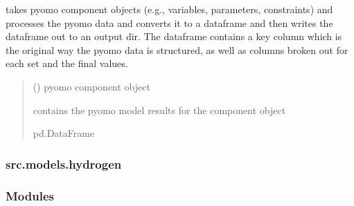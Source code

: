 \documentclass[letterpaper,10pt,english]{sphinxmanual}
\begin{document}
\begin{fulllineitems}
\label{\detokenize{src.models.electricity.scripts.utilities:src.models.electricity.scripts.utilities.create_obj_df}}
\pysigstartsignatures
\pysiglinewithargsret
{}
{}
{}
\pysigstopsignatures
\sphinxAtStartPar
takes pyomo component objects (e.g., variables, parameters, constraints) and processes the
pyomo data and converts it to a dataframe and then writes the dataframe out to an output dir.
The dataframe contains a key column which is the original way the pyomo data is structured,
as well as columns broken out for each set and the final values.
\begin{quote}\begin{description}
\sphinxAtStartPar
{} () \textendash{} pyomo component object

\sphinxAtStartPar
contains the pyomo model results for the component object

\sphinxAtStartPar
pd.DataFrame

\end{description}\end{quote}

\end{fulllineitems}


\sphinxstepscope


\subsubsection{src.models.hydrogen}
\label{\detokenize{src.models.hydrogen:module-src.models.hydrogen}}\label{\detokenize{src.models.hydrogen:src-models-hydrogen}}\label{\detokenize{src.models.hydrogen::doc}}\subsubsection*{Modules}
\end{document}
